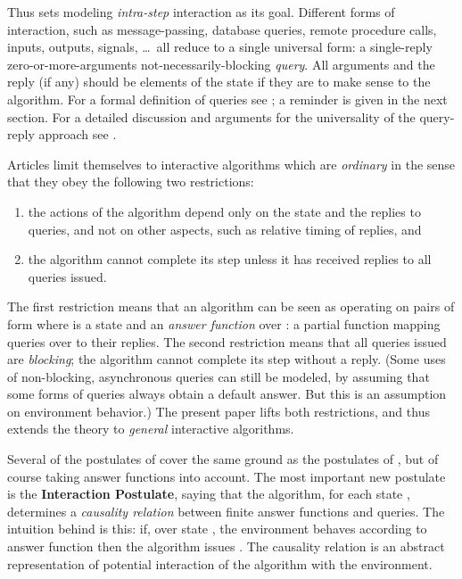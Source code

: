 \documentclass{LMCS}
\theoremstyle{definition}
\begin{document}
Thus \cite{oa1} sets modeling \emph{intra-step} interaction as its
goal. Different forms of interaction, such as message-passing, database
queries, remote procedure calls, inputs, outputs, signals, \ldots\ all
reduce to a single universal form: a single-reply zero-or-more-arguments
not-necessarily-blocking \emph{query}.  All arguments and the reply (if
any) should be elements of the state if they are to make sense to the
algorithm.  For a formal definition of queries see \cite{oa1}; a reminder
is given in the next section.  For a detailed discussion and arguments for
the universality of the query-reply approach see \cite{oa1}.

Articles \cite{oa1,oa2,oa3} limit themselves to interactive algorithms
which are \emph{ordinary} in the sense that they obey the following two
restrictions:
\begin{enumerate}
\item the actions of the algorithm depend only on the state and the
  replies to queries, and not on other aspects, such as relative
  timing of replies, and
\item the algorithm cannot complete its step unless it has received
replies to all queries issued.
\end{enumerate}
The first restriction means that an algorithm can be seen as operating
on pairs of form  where  is a state and  an
\emph{answer function} over : a partial function mapping queries
over  to their replies. The second restriction means that all
queries issued are \emph{blocking}; the algorithm cannot complete its
step without a reply. (Some uses of non-blocking, asynchronous queries
can still be modeled, by assuming that some forms of queries always
obtain a default answer. But this is an assumption on environment
behavior.)  The present paper lifts both restrictions, and thus
extends the theory to \emph{general} interactive algorithms.

Several of the postulates of \cite{oa1} cover the same ground as the
postulates of \cite{seqth}, but of course taking answer functions into
account.  The most important new postulate is the \textbf{Interaction
  Postulate}, saying that the algorithm, for each state ,
determines a \emph{causality relation}  between finite
answer functions and queries.  The intuition behind  is this: if, over state , the environment behaves according to
answer function  then the algorithm issues .  The causality
relation is an abstract representation of potential interaction of the
algorithm with the environment.
\end{document}
